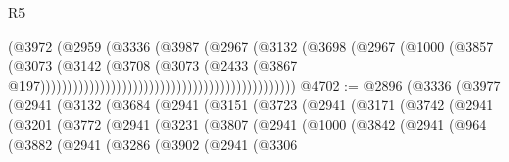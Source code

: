 \begin{lexlean}{R5}
\begin{coremodule}
                                                                  (@3972
                                                                    (@2959
                                                                      (@3336
                                                                        (@3987
                                                                          (@2967
                                                                            (@3132
                                                                              (@3698
                                                                                (@2967
                                                                                  (@1000
                                                                                    (@3857
                                                                                      (@3073
                                                                                        (@3142
                                                                                          (@3708
                                                                                            (@3073
                                                                                              (@2433
                                                                                                (@3867
                                                                                                  @197)))))))))))))))))))))))))))))))))))))))))))))))
@4702 := @2896
    (@3336
      (@3977
        (@2941
          (@3132
            (@3684
              (@2941
                (@3151
                  (@3723
                    (@2941
                      (@3171
                        (@3742
                          (@2941
                            (@3201
                              (@3772
                                (@2941
                                  (@3231
                                    (@3807
                                      (@2941
                                        (@1000
                                          (@3842
                                            (@2941
                                              (@964
                                                (@3882
                                                  (@2941
                                                    (@3286
                                                      (@3902
                                                        (@2941
                                                          (@3306

\end{coremodule}
\end{lexlean}
